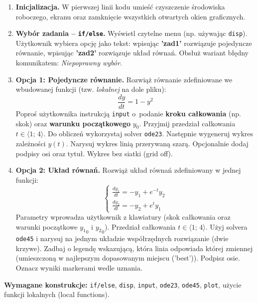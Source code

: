 \documentclass[a4paper,11pt]{article}
\begin{document}
\begin{enumerate}[leftmargin=*, label=\textbf{\arabic*.}, itemsep=2pt]

  \item \textbf{Inicjalizacja.}
    W pierwszej linii kodu umieść czyszczenie środowiska roboczego, ekranu oraz zamknięcie wszystkich otwartych okien graficznych.

  \item \textbf{Wybór zadania -- \texttt{if/else}.}
    Wyświetl czytelne menu (np. używając \texttt{disp}). Użytkownik wybiera opcję jako tekst: wpisując \textbf{'zad1'} rozwiązuje pojedyncze równanie, wpisując \textbf{'zad2'} rozwiązuje układ równań. Obsłuż wariant błędny komunikatem: \textit{Niepoprawny wybór}.

  \item \textbf{Opcja 1: Pojedyncze równanie.}
    Rozwiąż równanie zdefiniowane we wbudowanej funkcji (tzw. \textit{lokalnej} na dole pliku):
    \[ \frac{dy}{dt} = 1 - y^2 \]
    Poproś użytkownika instrukcją \texttt{input} o~podanie \textbf{kroku całkowania} (np. skok) oraz \textbf{warunku początkowego} $y_0$. Przyjmij przedział całkowania $t \in \langle 1;\,4 \rangle$.
    Do obliczeń wykorzystaj solver \texttt{ode23}. Następnie wygeneruj wykres zależności $y(t)$. Narysuj wykres linią przerywaną szarą. Opcjonalnie dodaj podpisy osi oraz tytuł. Wykres bez siatki (grid off).

  \item \textbf{Opcja 2: Układ równań.}
    Rozwiąż układ równań zdefiniowany w jednej funkcji:\\[-0.5em]
    \[
    \begin{cases}
      \frac{dy_1}{dt} = -y_1 + e^{-t}y_2 \\
      \frac{dy_2}{dt} = -y_2 + e^{t}y_1
    \end{cases}
    \]
    Parametry wprowadza użytkownik z klawiatury (skok całkowania oraz warunki początkowe $ {y_1}_{0} $ i $ {y_2}_{0} $). Przedział całkowania $t \in \langle 1;\,4 \rangle$.
    Użyj solvera \texttt{ode45} i narysuj na jednym układzie współrzędnych rozwiązanie (dwie krzywe). Zadbaj o legendę wskazującą, która linia odpowiada której zmiennej (umieszczoną w najlepszym dopasowanym miejscu ('best')). Podpisz osie. Oznacz wyniki markerami wedle uznania.

\end{enumerate}

\vspace{0.3cm}
\begin{ramka}
\textbf{Wymagane konstrukcje:}
\texttt{if/else}, \texttt{disp}, \texttt{input}, \texttt{ode23}, \texttt{ode45}, \texttt{plot}, użycie funkcji lokalnych (local functions).
\end{ramka}
\end{document}
